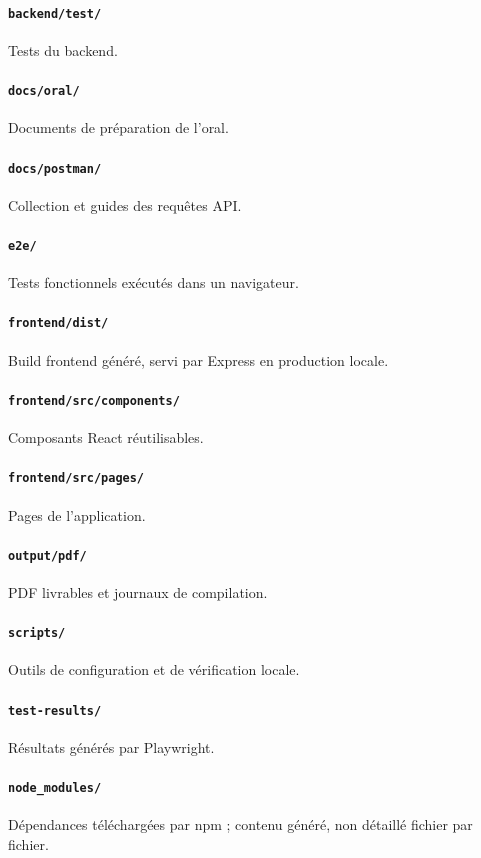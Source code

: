 \documentclass[10pt,a4paper]{article}
\begin{document}
\paragraph{\texttt{backend/test/}} Tests du backend.
\paragraph{\texttt{docs/oral/}} Documents de préparation de l'oral.
\paragraph{\texttt{docs/postman/}} Collection et guides des requêtes API.
\paragraph{\texttt{e2e/}} Tests fonctionnels exécutés dans un navigateur.
\paragraph{\texttt{frontend/dist/}} Build frontend généré, servi par Express en production locale.
\paragraph{\texttt{frontend/src/components/}} Composants React réutilisables.
\paragraph{\texttt{frontend/src/pages/}} Pages de l'application.
\paragraph{\texttt{output/pdf/}} PDF livrables et journaux de compilation.
\paragraph{\texttt{scripts/}} Outils de configuration et de vérification locale.
\paragraph{\texttt{test-results/}} Résultats générés par Playwright.
\paragraph{\texttt{node\_modules/}} Dépendances téléchargées par npm ; contenu généré, non détaillé fichier par fichier.
\end{document}
